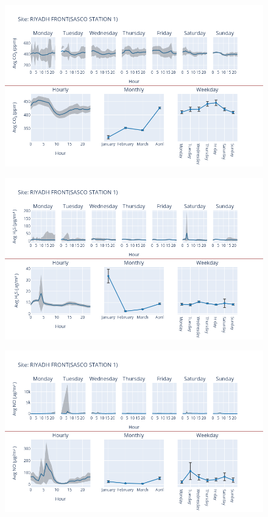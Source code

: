 \documentclass[12pt, oneside]{book}
\begin{document}
{ 
{\begin{figure}[H] 
 \centering 
\includegraphics[width=.88\textwidth, keepaspectratio]{image128} 
 \end{figure}}{} 

{\begin{figure}[H] 
 \centering 
\includegraphics[width=.88\textwidth, keepaspectratio]{image129} 
 \end{figure}}{} 

{\begin{figure}[H] 
 \centering 
\includegraphics[width=.88\textwidth, keepaspectratio]{image130} 
 \end{figure}}{} 

}
\end{document}
